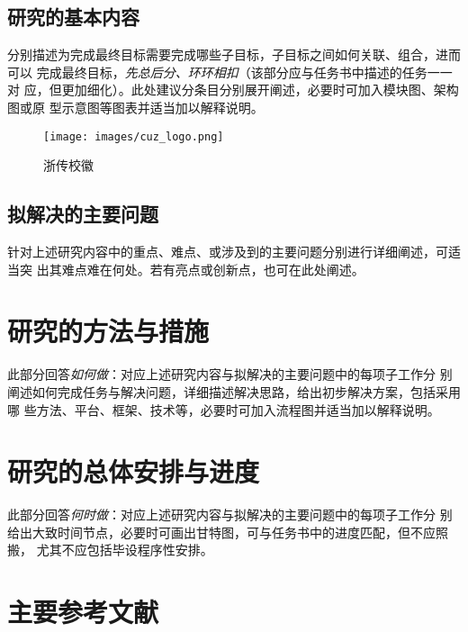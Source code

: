 \subsection{研究的基本内容}

\begin{tcolorbox}
	分别描述为完成最终目标需要完成哪些子目标，子目标之间如何关联、组合，进而可以
	完成最终目标，\emph{先总后分、环环相扣}（该部分应与任务书中描述的任务一一对
	应，但更加细化）。此处建议分条目分别展开阐述，必要时可加入模块图、架构图或原
	型示意图等图表并适当加以解释说明。
\end{tcolorbox}
\begin{figure}[h]
	\centering
	\texttt{[image: images/cuz\_logo.png]}
	\caption{浙传校徽}
	\label{fig:1}
\end{figure}

\subsection{拟解决的主要问题}

\begin{tcolorbox}
	针对上述研究内容中的重点、难点、或涉及到的主要问题分别进行详细阐述，可适当突
	出其难点难在何处。若有亮点或创新点，也可在此处阐述。
\end{tcolorbox}

\section{研究的方法与措施}

\begin{tcolorbox}
	此部分回答\emph{如何做}：对应上述研究内容与拟解决的主要问题中的每项子工作分
	别阐述如何完成任务与解决问题，详细描述解决思路，给出初步解决方案，包括采用哪
	些方法、平台、框架、技术等，必要时可加入流程图并适当加以解释说明。
\end{tcolorbox}

\section{研究的总体安排与进度}

\begin{tcolorbox}
	此部分回答\emph{何时做}：对应上述研究内容与拟解决的主要问题中的每项子工作分
	别给出大致时间节点，必要时可画出甘特图，可与任务书中的进度匹配，但不应照搬，
	尤其不应包括毕设程序性安排。
\end{tcolorbox}

\section{主要参考文献}

